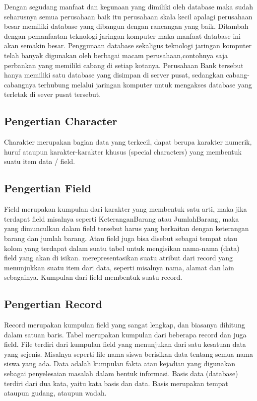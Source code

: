	Dengan segudang manfaat dan kegunaan yang dimiliki oleh database maka sudah seharusnya semua perusahaan baik itu perusahaan skala kecil apalagi perusahaan besar memiliki database yang dibangun dengan rancangan yang baik. Ditambah dengan pemanfaatan teknologi jaringan komputer maka manfaat database ini akan semakin besar. Penggunaan database sekaligus teknologi jaringan komputer telah banyak digunakan oleh berbagai macam perusahaan,contohnya saja perbankan yang memiliki cabang di setiap kotanya. Perusahaan Bank tersebut hanya memiliki satu database yang disimpan di server pusat, sedangkan cabang-cabangnya terhubung melalui jaringan komputer untuk mengakses database yang terletak di sever pusat tersebut.

\subsection{Pengertian Character}
	Charakter merupakan bagian data yang terkecil, dapat berupa karakter numerik, huruf ataupun karakter-karakter khusus (special characters) yang membentuk suatu item data / field.

\subsection{Pengertian Field} 
	Field merupakan kumpulan dari karakter yang membentuk satu arti, maka jika terdapat field misalnya seperti KeteranganBarang atau JumlahBarang, maka yang dimunculkan dalam field tersebut harus yang berkaitan dengan keterangan barang dan jumlah barang. Atau field juga bisa disebut sebagai tempat atau kolom yang terdapat dalam suatu tabel untuk mengisikan nama-nama (data) field yang akan di isikan. merepresentasikan suatu atribut dari record yang menunjukkan suatu item dari data, seperti misalnya nama, alamat dan lain sebagainya. Kumpulan dari field membentuk suatu record.

\subsection{Pengertian Record}
	Record merupakan kumpulan field yang sangat lengkap, dan biasanya dihitung dalam satuan baris. Tabel merupakan kumpulan dari beberapa record dan juga field. File terdiri dari kumpulan field yang menunjukan dari satu kesatuan data yang sejenis. Misalnya seperti file nama siswa berisikan data tentang semua nama siswa yang ada. Data adalah kumpulan fakta atau kejadian yang digunakan sebagai penyelesaian masalah dalam bentuk informasi. Basis data (database) terdiri dari dua kata, yaitu kata basis dan data. Basis merupakan tempat ataupun gudang, ataupun wadah.

